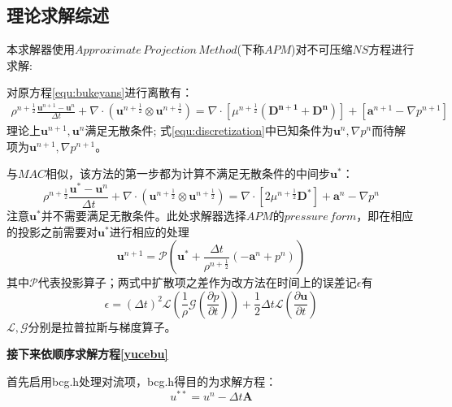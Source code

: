 \documentclass[lang=cn,11pt,a4paper]{elegantpaper}
\begin{document}
\subsection{理论求解综述}
本求解器使用$Approximate \,Projection \,Method$(下称$APM$)对不可压缩$NS$方程进行求解:\par
对原方程\ref{equ:bukeyans}进行离散有：
\begin{equation}\label{equ:discretization}
        \begin{aligned}
        \rho^{n+\frac{1}{2}}\frac{\mathbf{u}^{n+1} - \mathbf{u}^{n}}{\Delta t}+\nabla\cdot(\mathbf{u}^{n+\frac{1}{2}}\otimes\mathbf{u}^{n+\frac{1}{2}})=  \nabla \cdot [\mu^{n+\frac{1}{2}}(\mathbf{D^{n+1}}+\mathbf{D^n})]+ [\mathbf{a}^{n+1}-\nabla p^{n+1}]
    \end{aligned}
\end{equation}
理论上$\mathbf{u}^{n+1},\mathbf{u}^{n}$满足无散条件;
式\ref{equ:discretization}中已知条件为$\mathbf{u}^n,\nabla p^{n}$而待解项为$\mathbf{u}^{n+1},\nabla p^{n+1}$。\par
与$MAC$相似\cite{harlow1965numerical}，该方法的第一步都为计算不满足无散条件的中间步$ \mathbf{u} ^*$：
\begin{equation}\label{yucebu}
    \rho^{n+\frac{1}{2}}\frac{\mathbf{u}^* - \mathbf{u}^{n}}{\Delta t}+\nabla\cdot(\mathbf{u}^{n+\frac{1}{2}}\otimes\mathbf{u}^{n+\frac{1}{2}})= \nabla \cdot [2\mu^{n+\frac{1}{2}}\mathbf{D^*}]+ \mathbf{a}^{n}-\nabla p^{n}
\end{equation}
注意$\mathbf{u^*}$并不需要满足无散条件。此处求解器选择$APM$的$pressure\, form$\cite{drikakis2005high}，即在相应的投影之前需要对$ \mathbf{u} ^*$进行相应的处理
\begin{equation}\label{equ:poisson}
    \mathbf{u}^{n+1} = \mathscr{P}( \mathbf{u}^* + \frac{\Delta t}{\rho^{n+\frac{1}{2}}}( -\mathbf{a}^{n} + p^{n}))
\end{equation}
其中$\mathscr{P}$代表投影算子；两式中扩散项之差作为改方法在时间上的误差记$\epsilon$有
\begin{equation}
    \epsilon = (\Delta t)^2\mathscr{L}(\frac{1}{\rho}\mathscr{G}(\frac{\partial p}{\partial t}))+\frac{1}{2}\Delta t\mathscr{L}(\frac{\partial \mathbf{u}}{\partial t})
\end{equation}
$\mathscr{L},\mathscr{G}$分别是拉普拉斯与梯度算子。\par
\textbf{接下来依顺序求解方程\ref{yucebu}}\par
首先启用bcg.h处理对流项，bcg.h得目的为求解方程：
\begin{equation}\label{equ:duiliu}
    u^{**}=u^n-\Delta t \mathbf{A}
\end{equation}
\end{document}
